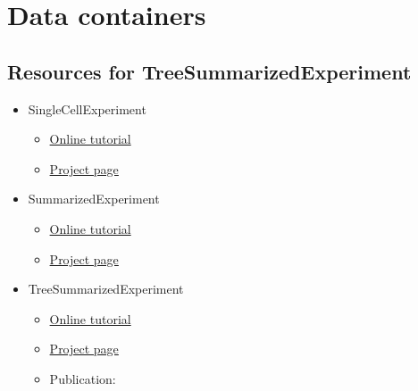 \documentclass[
]{book}
\providecommand{\tightlist}{%
  \setlength{\itemsep}{0pt}\setlength{\parskip}{0pt}}
\begin{document}
\hypertarget{data-containers-1}{%
\section{Data containers}\label{data-containers-1}}

\hypertarget{resources-for-treesummarizedexperiment}{%
\subsection{Resources for TreeSummarizedExperiment}\label{resources-for-treesummarizedexperiment}}

\begin{itemize}
\tightlist
\item
  SingleCellExperiment \citep{R-SingleCellExperiment}

  \begin{itemize}
  \tightlist
  \item
    \href{https://bioconductor.org/packages/release/bioc/vignettes/SingleCellExperiment/inst/doc/intro.html}{Online tutorial}
  \item
    \href{https://bioconductor.org/packages/release/bioc/html/SingleCellExperiment.html}{Project page}
  \end{itemize}
\item
  SummarizedExperiment \citep{R-SummarizedExperiment}

  \begin{itemize}
  \tightlist
  \item
    \href{https://bioconductor.org/packages/release/bioc/vignettes/SummarizedExperiment/inst/doc/SummarizedExperiment.html}{Online tutorial}
  \item
    \href{https://bioconductor.org/packages/release/bioc/html/SummarizedExperiment.html}{Project page}
  \end{itemize}
\item
  TreeSummarizedExperiment \citep{R-TreeSummarizedExperiment}

  \begin{itemize}
  \tightlist
  \item
    \href{https://bioconductor.org/packages/release/bioc/vignettes/TreeSummarizedExperiment/inst/doc/Introduction_to_treeSummarizedExperiment.html}{Online tutorial}
  \item
    \href{https://www.bioconductor.org/packages/release/bioc/html/TreeSummarizedExperiment.html}{Project page}
  \item
    Publication: \citep{Huang2021}
  \end{itemize}
\end{itemize}
\end{document}
